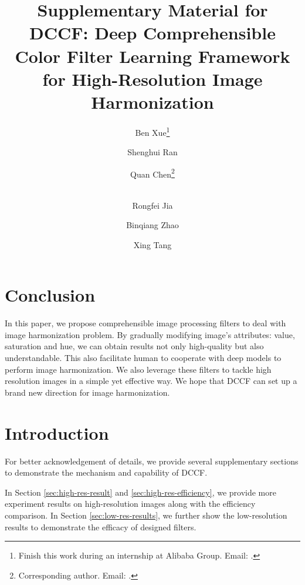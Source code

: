 \documentclass[runningheads]{llncs}
\begin{document}
    \section{Conclusion}
    
    In this paper, we propose comprehensible image processing filters to deal with image harmonization problem. 
    By gradually modifying image's attributes: value, saturation and hue, we can obtain results not only high-quality but also understandable. 
    This also facilitate human to cooperate with deep models to perform image harmonization.
    We also leverage these filters to tackle high resolution images in a simple yet effective way. 
    We hope that DCCF can set up a brand new direction for image harmonization.
    

\clearpage





\title{Supplementary Material for DCCF: Deep Comprehensible Color Filter Learning Framework for High-Resolution Image Harmonization} 
\author{Ben Xue\thanks{Finish this work during an internship at Alibaba Group. Email: .}\and
Shenghui Ran \and
Quan Chen\thanks{Corresponding author. Email: . }\and \\
Rongfei Jia\and
Binqiang Zhao\and
Xing Tang\\
}



\maketitle

\section{Introduction}


For better acknowledgement of details, we provide several supplementary sections to demonstrate the mechanism and capability of DCCF.

In Section \ref{sec:high-res-result} and \ref{sec:high-res-efficiency}, we provide more experiment results on high-resolution images along with the efficiency comparison.
In Section \ref{sec:low-res-results}, we further show the low-resolution results to demonstrate the efficacy of designed filters. 
\end{document}
